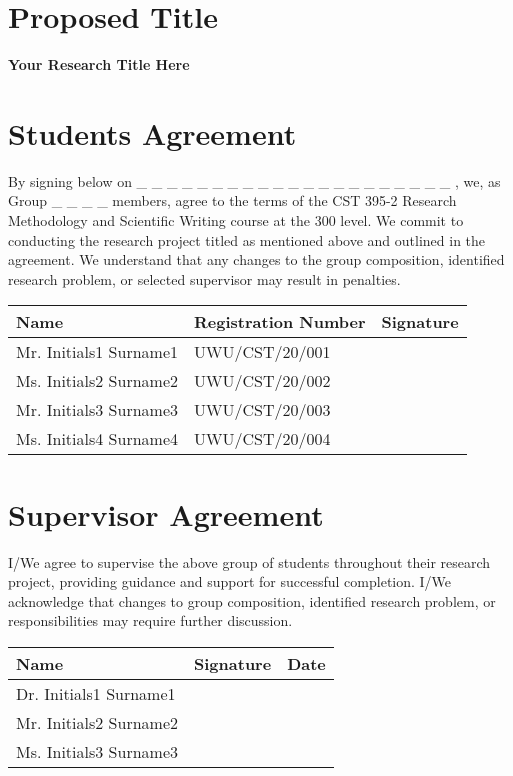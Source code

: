 \section*{\large Proposed Title}
\textbf{Your Research Title Here}


\section*{\large Students Agreement}
\parbox{\textwidth}{
	By signing below on \_ \_ \_ \_ \_ \_ \_ \_ \_ \_ \_ \_ \_ \_ \_ \_ \_ \_ \_ \_ \_ , we, as Group \_ \_ \_ \_ members, agree to the terms of the CST 395-2 Research Methodology and Scientific Writing course at the 300 level. We commit to conducting the research project titled as mentioned above and outlined in the agreement. We understand that any changes to the group composition, identified research problem, or selected supervisor may result in penalties.\\
	
	\begin{tabularx}{\textwidth}{|l|l|X|}
		\hline
		\textbf{Name} & \textbf{Registration Number} & \multicolumn{1}{c|}{\textbf{Signature}} \\
		\hline
		Mr. Initials1 Surname1 & UWU/CST/20/001 & \\[10pt] %
		\hline	
		Ms. Initials2 Surname2 & UWU/CST/20/002 & \\[10pt] %
		\hline
		Mr. Initials3 Surname3 & UWU/CST/20/003 & \\[10pt] %
		\hline	
		Ms. Initials4 Surname4 & UWU/CST/20/004 & \\[10pt] %
		\hline
	\end{tabularx}
}


\section*{\large Supervisor Agreement}
\parbox{\textwidth}{
	I/We agree to supervise the above group of students throughout their research project, providing guidance and support for successful completion. I/We acknowledge that changes to group composition, identified research problem, or responsibilities may require further discussion.\\
	
	\begin{tabularx}{\textwidth}{|l|X|X|}
		\hline
		\textbf{Name} & \multicolumn{1}{c|}{\textbf{Signature}} & \multicolumn{1}{c|}{\textbf{Date}}  \\
		\hline
		Dr. Initials1 Surname1 &  & \\[10pt] %
		\hline		
		Mr. Initials2 Surname2 &  & \\[10pt] %
		\hline		
		Ms. Initials3 Surname3 &  & \\[10pt] %
		\hline
	\end{tabularx}
}